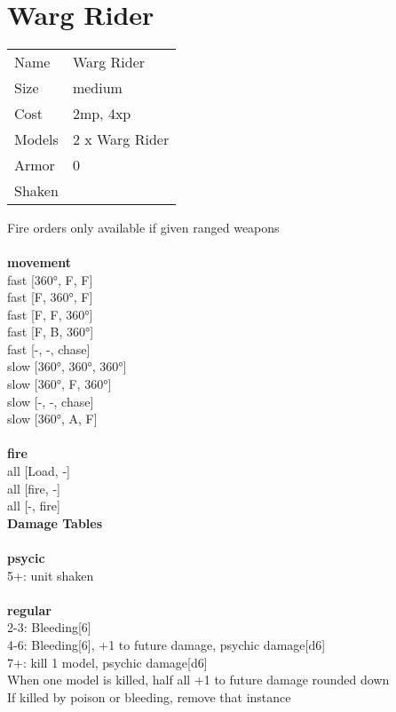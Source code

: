 \ \\













\clearpage

\section{ Warg Rider }

\begin{tabular}{ll}
  Name & Warg Rider \\
  Size & medium\\
  Cost & 2mp, 4xp\\
  Models & 2 x Warg Rider\\
  Armor & 0\\
  Shaken & \\
\end{tabular}

\noindent Fire orders only available if given ranged weapons\\ 


\ \\ {\bf movement } \\
fast [360°, F, F] \\
fast [F, 360°, F] \\
fast [F, F, 360°] \\
fast [F, B, 360°] \\
fast [-, -, chase] \\
slow [360°, 360°, 360°] \\
slow [360°, F, 360°] \\
slow [-, -, chase] \\
slow [360°, A, F] \\
\ \\ {\bf fire } \\
all [Load, -] \\
all [fire, -] \\
all [-, fire] \\


{\bf Damage Tables} \\
\ \\ {\bf psycic } \\
5+: unit shaken \\
\ \\ {\bf regular } \\
2-3: Bleeding[6] \\
4-6: Bleeding[6], +1 to future damage, psychic damage[d6] \\
7+: kill 1 model, psychic damage[d6] \\
When one model is killed, half all +1 to future damage rounded down \\
If killed by poison or bleeding, remove that instance \\


